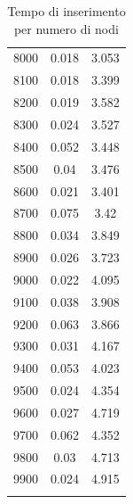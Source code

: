 \documentclass{article}
\begin{document}
\begin{longtable}{c|c|c}
             8000 &        0.018 &           3.053 \\
             8100 &        0.018 &           3.399 \\
             8200 &        0.019 &           3.582 \\
             8300 &        0.024 &           3.527 \\
             8400 &        0.052 &           3.448 \\
             8500 &        0.04  &           3.476 \\
             8600 &        0.021 &           3.401 \\
             8700 &        0.075 &           3.42  \\
             8800 &        0.034 &           3.849 \\
             8900 &        0.026 &           3.723 \\
             9000 &        0.022 &           4.095 \\
             9100 &        0.038 &           3.908 \\
             9200 &        0.063 &           3.866 \\
             9300 &        0.031 &           4.167 \\
             9400 &        0.053 &           4.023 \\
             9500 &        0.024 &           4.354 \\
             9600 &        0.027 &           4.719 \\
             9700 &        0.062 &           4.352 \\
             9800 &        0.03  &           4.713 \\
             9900 &        0.024 &           4.915 \\
\hline
\caption{Tempo di inserimento per numero di nodi}
\end{longtable}
\end{document}
